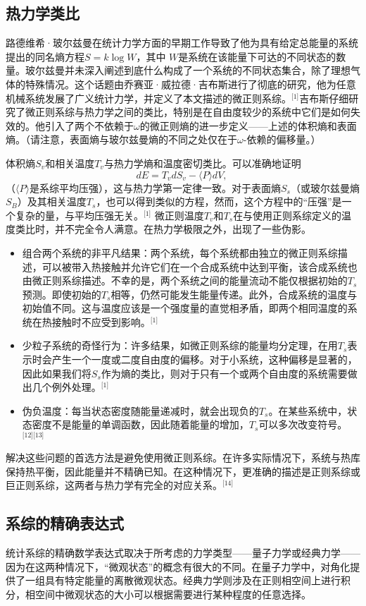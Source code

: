 \subsection{热力学类比}  
路德维希·玻尔兹曼在统计力学方面的早期工作导致了他为具有给定总能量的系统提出的同名熵方程\( S = k \log W \)，其中 \( W \)是系统在该能量下可达的不同状态的数量。玻尔兹曼并未深入阐述到底什么构成了一个系统的不同状态集合，除了理想气体的特殊情况。这个话题由乔赛亚·威拉德·吉布斯进行了彻底的研究，他为任意机械系统发展了广义统计力学，并定义了本文描述的微正则系综。\(^\text{[1]}\)吉布斯仔细研究了微正则系综与热力学之间的类比，特别是在自由度较少的系统中它们是如何失效的。他引入了两个不依赖于\( \omega \)的微正则熵的进一步定义——上述的体积熵和表面熵。（请注意，表面熵与玻尔兹曼熵的不同之处仅在于\( \omega \)-依赖的偏移量。）

体积熵\( S_v \)和相关温度\( T_v \)与热力学熵和温度密切类比。可以准确地证明
\[
dE = T_v dS_v - \langle P \rangle dV,~
\]
（\( \langle P \rangle \)是系综平均压强），这与热力学第一定律一致。对于表面熵\( S_s \)（或玻尔兹曼熵\( S_B \)）及其相关温度\( T_s \)，也可以得到类似的方程，然而，这个方程中的“压强”是一个复杂的量，与平均压强无关。\(^\text{[1]}\)
微正则温度\( T_v \)和\( T_s \)在与使用正则系综定义的温度类比时，并不完全令人满意。在热力学极限之外，出现了一些伪影。
\begin{itemize}
\item 组合两个系统的非平凡结果：两个系统，每个系统都由独立的微正则系综描述，可以被带入热接触并允许它们在一个合成系统中达到平衡，该合成系统也由微正则系综描述。不幸的是，两个系统之间的能量流动不能仅根据初始的\( T_s \)预测。即使初始的\( T_s \)相等，仍然可能发生能量传递。此外，合成系统的温度与初始值不同。这与温度应该是一个强度量的直觉相矛盾，即两个相同温度的系统在热接触时不应受到影响。\(^\text{[1]}\)
\item 少粒子系统的奇怪行为：许多结果，如微正则系综的能量均分定理，在用\( T_s \)表示时会产生一个一度或二度自由度的偏移。对于小系统，这种偏移是显著的，因此如果我们将\( S_s \)作为熵的类比，则对于只有一个或两个自由度的系统需要做出几个例外处理。\(^\text{[1]}\)
\item 伪负温度：每当状态密度随能量递减时，就会出现负的\( T_s \)。在某些系统中，状态密度不是能量的单调函数，因此随着能量的增加，\( T_s \)可以多次改变符号。\(^\text{[12][13]}\)
\end{itemize}
解决这些问题的首选方法是避免使用微正则系综。在许多实际情况下，系统与热库保持热平衡，因此能量并不精确已知。在这种情况下，更准确的描述是正则系综或巨正则系综，这两者与热力学有完全的对应关系。\(^\text{[14]}\)
\subsection{系综的精确表达式}  
统计系综的精确数学表达式取决于所考虑的力学类型——量子力学或经典力学——因为在这两种情况下，“微观状态”的概念有很大的不同。在量子力学中，对角化提供了一组具有特定能量的离散微观状态。经典力学则涉及在正则相空间上进行积分，相空间中微观状态的大小可以根据需要进行某种程度的任意选择。

